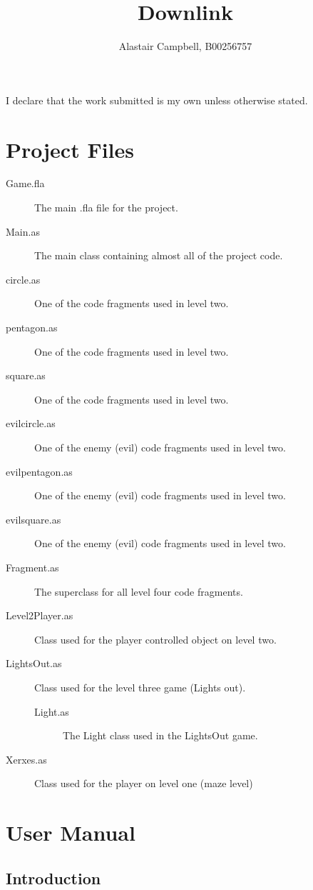 \documentclass{article}
\title{Downlink}
\author{Alastair Campbell, B00256757}
\begin{document}
\begin{titlepage}
\maketitle
I declare that the work submitted is my own unless otherwise stated.
\end{titlepage}

\section{Project Files}

\begin{description}
\item[Game.fla]{The main .fla file for the project.}
\item[Main.as]{The main class containing almost all of the project code.}
\item[circle.as]{One of the code fragments used in level two.}
\item[pentagon.as]{One of the code fragments used in level two.}
\item[square.as]{One of the code fragments used in level two.}
\item[evilcircle.as]{One of the enemy (evil) code fragments used in level two.}
\item[evilpentagon.as]{One of the enemy (evil) code fragments used in level two.}
\item[evilsquare.as]{One of the enemy (evil) code fragments used in level two.}
\item[Fragment.as]{The superclass for all level four code fragments.}
\item[Level2Player.as]{Class used for the player controlled object on level two.}
\item[LightsOut.as]{Class used for the level three game (Lights out).}
\begin{description}
        \item[Light.as]{The Light class used in the LightsOut game.}
\end{description}
\item[Xerxes.as]{Class used for the player on level one (maze level)}
\end{description}
\section {User Manual}
\subsection {Introduction}
\end{document}
